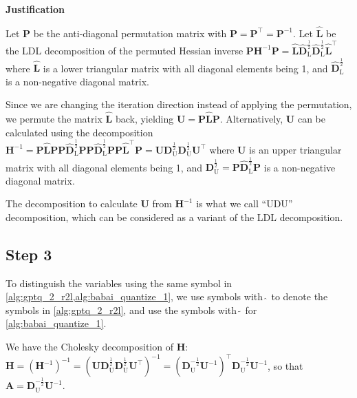 \documentclass{article} %
\begin{document}
\textbf{Justification}

Let $\mathbf{P}$ be the anti-diagonal permutation matrix with $\mathbf{P} = \mathbf{P}^\top = \mathbf{P}^{-1}$.
Let $\hat{\bm{L}}$ be the LDL decomposition of the permuted Hessian inverse $\mathbf{P} \bm{H}^{-1} \mathbf{P} = \hat{\bm{L}} \hat{\bm{D}}_{\mathrm{L}}^{\frac{1}{2}} \hat{\bm{D}}_{\mathrm{L}}^{\frac{1}{2}} \hat{\bm{L}}^\top$ where $\hat{\bm{L}}$ is a lower triangular matrix with all diagonal elements being 1, and $\hat{\bm{D}}_{\mathrm{L}}^{\frac{1}{2}}$ is a non-negative diagonal matrix.

Since we are changing the iteration direction instead of applying the permutation, we permute the matrix $\hat{\bm{L}}$ back, yielding $\bm{U} = \mathbf{P} \hat{\bm{L}} \mathbf{P}$.
Alternatively, $\bm{U}$ can be calculated using the decomposition
$\bm{H}^{-1} = \mathbf{P} \hat{\bm{L}} \mathbf{P} \mathbf{P} \hat{\bm{D}}_{\mathrm{L}}^{\frac{1}{2}} \mathbf{P} \mathbf{P} \hat{\bm{D}}_{\mathrm{L}}^{\frac{1}{2}} \mathbf{P} \mathbf{P} \hat{\bm{L}}^\top \mathbf{P} = \bm{U} \bm{D}_{\mathrm{U}}^{\frac{1}{2}} \bm{D}_{\mathrm{U}}^{\frac{1}{2}} \bm{U}^\top$
where $\bm{U}$ is an upper triangular matrix with all diagonal elements being 1, and $\bm{D}_{\mathrm{U}}^{\frac{1}{2}} = \mathbf{P} \hat{\bm{D}}_{\mathrm{L}}^{\frac{1}{2}} \mathbf{P}$ is a non-negative diagonal matrix.

The decomposition to calculate $\bm{U}$ from $\bm{H}^{-1}$ is what we call ``UDU'' decomposition, which can be considered as a variant of the LDL decomposition. 

\subsection{Step 3}
\label{sec:app_proof_gptq_babai_step_3}

To distinguish the variables using the same symbol in \cref{alg:gptq_2_r2l,alg:babai_quantize_1}, we use symbols with $\hat{\ }$ to denote the symbols in \cref{alg:gptq_2_r2l}, and use the symbols with $\tilde{\ }$ for \cref{alg:babai_quantize_1}.

We have the Cholesky decomposition of $\bm{H}$: $\bm{H} = \left( \bm{H}^{-1} \right)^{-1} = \left( \bm{U} \bm{D}_{\mathrm{U}}^{\frac{1}{2}} \bm{D}_{\mathrm{U}}^{\frac{1}{2}} \bm{U}^\top \right)^{-1} = \left( \bm{D}_{\mathrm{U}}^{-\frac{1}{2}} \bm{U}^{-1} \right)^\top \bm{D}_{\mathrm{U}}^{-\frac{1}{2}} \bm{U}^{-1}$, so that $\bm{A} = \bm{D}_{\mathrm{U}}^{-\frac{1}{2}} \bm{U}^{-1}$.
\end{document}
